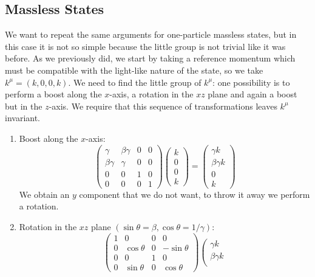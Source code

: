 \documentclass[../main.tex]{subfiles}
\begin{document}
\subsection{Massless States}
We want to repeat the same arguments for one-particle massless states, but in this case it is not so simple because the little group is not trivial like it was before. As we previously did, we start by taking a reference momentum which must be compatible with the light-like nature of the state, so we take $k^\mu=(k,0,0,k)$. We need to find the little group of $k^\mu$: one possibility is to perform a boost along the $x$-axis, a rotation in the $xz$ plane and again a boost but in the $z$-axis. We require that this sequence of transformations leaves $k^\mu$ invariant.
\begin{enumerate}
    \item Boost along the $x$-axis:
    \[
    \left(\begin{array}{cccc}
    \gamma & \beta\gamma & 0 & 0 \\
    \beta\gamma & \gamma & 0 & 0 \\
    0 & 0 & 1 & 0 \\
    0 & 0 & 0 & 1 
    \end{array}\right)
    \left(\begin{array}{c}
    k \\
    0 \\
    0 \\
    k
    \end{array}\right)=
    \left(\begin{array}{c}
    \gamma k \\
    \beta\gamma k \\
    0 \\
    k
    \end{array}\right)
    \]
    We obtain an $y$ component that we do not want, to throw it away we perform a rotation.
    \item Rotation in the $xz$ plane $(\sin\theta=\beta, \cos\theta=1/\gamma)$:
    \[
    \left(\begin{array}{cccc}
    1 & 0 & 0 & 0 \\
    0 & \cos\theta & 0 & -\sin\theta \\
    0 & 0 & 1 & 0 \\
    0 & \sin\theta & 0 & \cos\theta 
    \end{array}\right)
    \left(\begin{array}{c}
    \gamma k \\
    \beta\gamma k \\

\end{array}\]
\end{enumerate}
\end{document}
